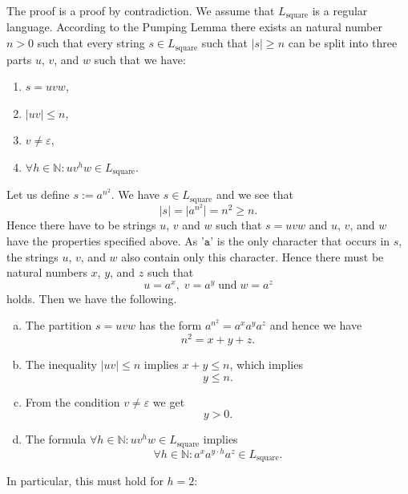 \solutionEng
The proof is a proof by contradiction.  We assume that $L_{\mathrm{square}}$ is a regular language.
According to the Pumping Lemma there exists an natural number $n>0$
such that every string
$s \in L_{\mathrm{square}}$ such that $|s| \geq n$ can be split into three parts $u$, $v$, and $w$ such that we
have:
\begin{enumerate}
\item $s = uvw$,
\item $|uv| \leq n$,
\item $v \not= \varepsilon$,
\item $\forall h \in \mathbb{N}: uv^hw \in L_{\mathrm{square}}$. 
\end{enumerate} 
Let us define $s := a^{n^2}$.  We have $s \in L_{\mathrm{square}}$ and we see that
\[ |s| = \big| a^{n^2} \big| = n^2 \geq n. \]
Hence there have to be strings $u$, $v$ and $w$ such that $s = uvw$ and $u$, $v$, and $w$ have
the properties specified above.
As '$\mathtt{a}$' is the only character that occurs in $s$, the strings $u$, $v$, and $w$ also contain only this character.
Hence there must be natural numbers $x$, $y$, and $z$ such that 
\[ u = a^x,\; v = a^y\; \mbox{und}\; w = a^z \]
holds.  Then we have the following.
\begin{enumerate}[(a)]
\item The partition  $s = uvw$ has the form $a^{n^2} = a^xa^ya^z$ and hence we have
      \begin{equation}
        \label{eq:e1}
         n^2 = x + y + z.     
      \end{equation}
\item The inequality $|uv| \leq n$ implies $x +y \leq n$, which implies
      \begin{equation}
        \label{eq:e2}
        y \leq n.
      \end{equation}
\item From the condition $v \not= \varepsilon$ we get
      \begin{equation}
        \label{eq:e3}
        y > 0.
      \end{equation}
\item The formula $\forall h \in \mathbb{N}: uv^hw \in L_{\mathrm{square}}$ implies
      \begin{equation}
        \label{eq:e4}
        \forall h \in \mathbb{N}: a^xa^{y\cdot h}a^z \in L_{\mathrm{square}}. 
      \end{equation}
\end{enumerate}
In particular, this must hold for $h=2$:
